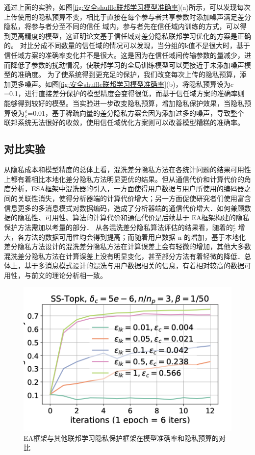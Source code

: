 通过上面的实验，如图\ref{fig:安全shuffle联邦学习模型准确率}(a)所示，可以发现每次上传使用的隐私预算不变，相比于直接在每个参与者共享参数时添加噪声满足差分隐私，将参与者分至不同的信任
域内，参与者先在信任域内训练的方式，可以得到更高精度的模型，这证明论文基于信任域对差分隐私联邦学习优化的方案是正确的。 
对比分成不同数量的信任域的情况可以发现，当分组的k值不是很大时，基于信任域方案的准确率变化并不是很大。这是因为在信任域间传输参数的量减少，进而降低了参数的扰动情况，使联邦学习的全局训练模型可以更接近于未添加噪声模型的准确度。 
为了使系统得到更充足的保护，我们改变每次上传的隐私预算，添加更多噪声。如图\ref{fig:安全shuffle联邦学习模型准确率}(b)，将隐私预算设为$c$=0.1，进行直接差分保护的模型精度会变得很低，而基于信任域方案的准确率则能够得到较好的模型。当实验进一步改变隐私预算，增加隐私保护效果，当隐私预算设为$\frac{\epsilon}{c}$=0.01，基于稀疏向量的差分隐私方案会因为添加过多的噪声，导致整个联邦系统无法很好的收敛，使用信任域优化方案则可以改善模型糟糕的准确率。 

\subsection{对比实验}
从隐私成本和模型精度的总体上看，混洗差分隐私方法在各统计问题的结果可用性上都有着相比本地化差分隐私方法明显更优的结果。但从通信代价和计算代价的角度分析，ESA框架中混洗器的引入，一方面使得用户数据与用户所使用的编码器之间的关联性消失，使得分析器端的计算代价增大；另一方面促使研究者们使用富含信息更多的多消息模式对数据编码，造成了分析器端的通信代价增大．如何兼顾数据的隐私性、可用性、算法的计算代价和通信代价是后续基于 EA框架构建的隐私保护方法需加以考量的部分． 从各混洗差分隐私算法评估的结果看，随着的$\frac{\epsilon}{c}$
增大，各方法的数据可用性均会得到提高；而随着用户数据 n 的增加，基于本地化差分隐私方法设计的混洗差分隐私方法在计算误差上会有轻微的增加，其他大多数混洗差分隐私方法在计算误差上没有明显变化，甚至部分方法有着轻微的降低．总体上，基于多消息模式设计的混洗与用户数据相关的信息，有着相对较高的数据可用性，与前文的理论分析相一致。

\begin{figure}[!hbt]
\centering
  	\includegraphics[scale=0.6]{fig2/C5/对比实验}%
	\caption{EA框架与其他联邦学习隐私保护框架在模型准确率和隐私预算的对比}
  	\label{fig:EA框架与其他联邦学习隐私保护框架在模型准确率和隐私预算的对比} 
\end{figure}


